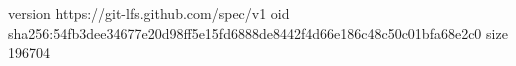 version https://git-lfs.github.com/spec/v1
oid sha256:54fb3dee34677e20d98ff5e15fd6888de8442f4d66e186c48c50c01bfa68e2c0
size 196704
